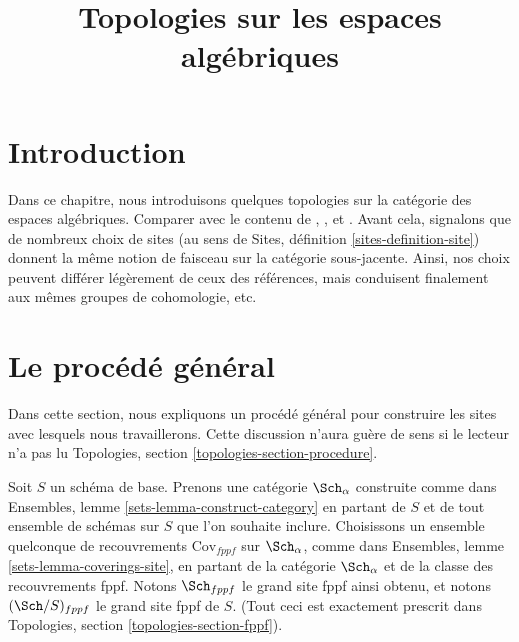 

%


\title{Topologies sur les espaces algébriques}

\maketitle

\label{section-phantom}

\tableofcontents




\section{Introduction}
\label{section-introduction}

\noindent
Dans ce chapitre, nous introduisons quelques topologies sur la
catégorie des espaces algébriques. Comparer avec le contenu de \cite{SGA1},
\cite{Ner}, \cite{LM-B} et \cite{Kn}.
Avant cela, signalons que
de nombreux choix de sites (au sens de
Sites, définition \ref{sites-definition-site}) donnent
la même notion de faisceau sur la catégorie sous-jacente. Ainsi,
nos choix peuvent différer légèrement de ceux des références,
mais conduisent finalement aux mêmes groupes de cohomologie, etc.




\section{Le procédé général}
\label{section-procedure}

\noindent
Dans cette section, nous expliquons un procédé général pour construire les
sites avec lesquels nous travaillerons. Cette discussion n'aura guère de
sens si le lecteur n'a pas lu
Topologies, section \ref{topologies-section-procedure}.

\medskip\noindent
Soit $S$ un schéma de base.
Prenons une catégorie $\Sch_\alpha$ construite comme dans
Ensembles, lemme \ref{sets-lemma-construct-category} en partant de
$S$ et de tout ensemble de schémas sur $S$ que l'on souhaite inclure.
Choisissons un ensemble quelconque de
recouvrements $\text{Cov}_{fppf}$ sur $\Sch_\alpha$, comme dans
Ensembles, lemme \ref{sets-lemma-coverings-site},
en partant de la catégorie $\Sch_\alpha$ et de la classe des recouvrements fppf.
Notons $\Sch_{fppf}$ le grand site fppf ainsi
obtenu, et notons $(\Sch/S)_{fppf}$ le
grand site fppf de $S$. (Tout ceci est exactement prescrit dans Topologies,
section \ref{topologies-section-fppf}).

